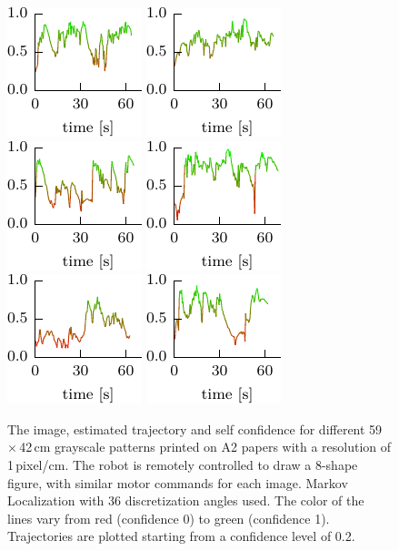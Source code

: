 \documentclass{svmult}
\begin{document}
\begin{figure}
\includegraphics[width=.15\textwidth]{breugel_babel-conf} \hfill
\includegraphics[width=.15\textwidth]{van-gogh_starry-night-conf} \hfill
\includegraphics[width=.15\textwidth]{kandinsky_comp-8-conf} \hfill
\includegraphics[width=.15\textwidth]{vermeer_girl-pearl-conf} \hfill
\includegraphics[width=.15\textwidth]{babar-conf} \hfill
\includegraphics[width=.15\textwidth]{child-drawing_tooth-fairy-conf}

\caption{The image, estimated trajectory and self confidence for different 59\,$\times$\,42\,cm grayscale patterns printed on A2 papers with a resolution of 1\,pixel/cm.
The robot is remotely controlled to draw a 8-shape figure, with similar motor commands for each image.
Markov Localization with 36 discretization angles used.
The color of the lines vary from red (confidence 0) to green (confidence 1).
Trajectories are plotted starting from a confidence level of 0.2.}
\label{fig:a2_drawings}

\end{figure}
\end{document}
